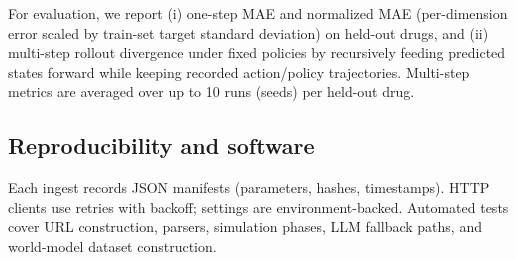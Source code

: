 For evaluation, we report (i) one-step MAE and normalized MAE (per-dimension error scaled by train-set target standard deviation) on held-out drugs, and (ii) multi-step rollout divergence under fixed policies by recursively feeding predicted states forward while keeping recorded action/policy trajectories. Multi-step metrics are averaged over up to 10 runs (seeds) per held-out drug.

\subsection{Reproducibility and software}
Each ingest records JSON manifests (parameters, hashes, timestamps). HTTP clients use retries with backoff; settings are environment-backed. Automated tests cover URL construction, parsers, simulation phases, LLM fallback paths, and world-model dataset construction.

% 
